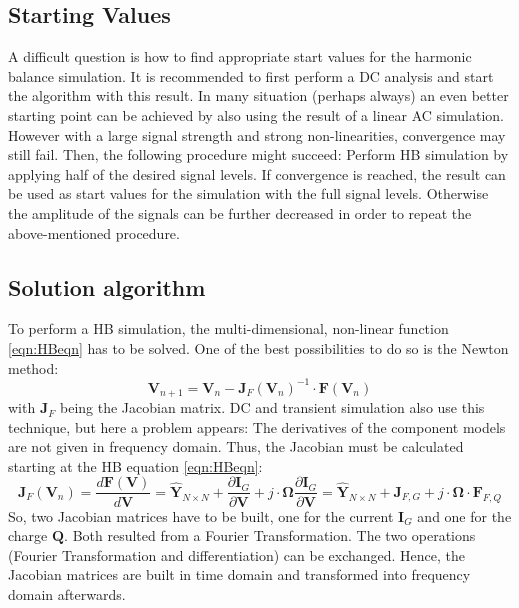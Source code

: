 \subsection{Starting Values}

A difficult question is how to find appropriate start values for the
harmonic balance simulation. It is recommended to first perform a DC
analysis and start the algorithm with this result. In many situation
(perhaps always) an even better starting point can be achieved by
also using the result of a linear AC simulation. However with a large
signal strength and strong non-linearities, convergence may still
fail. Then, the following procedure might succeed: Perform HB
simulation by applying half of the desired signal levels. If convergence
is reached, the result can be used as start values for the simulation
with the full signal levels. Otherwise the amplitude of the signals can
be further decreased in order to repeat the above-mentioned procedure.


\subsection{Solution algorithm}

To perform a HB simulation, the multi-dimensional, non-linear function
\ref{eqn:HBeqn} has to be solved. One of the best possibilities to
do so is the Newton method:
\begin{equation}
\textbf{V}_{n+1} = \textbf{V}_n - \textbf{J}_F (\textbf{V}_n)^{-1}
                   \cdot \textbf{F} (\textbf{V}_n)
\end{equation}
with $\textbf{J}_F$ being the Jacobian matrix. DC and transient
simulation also use this technique, but here a problem appears:
The derivatives of the component models are not given in frequency
domain. Thus, the Jacobian must be calculated starting at the HB
equation \ref{eqn:HBeqn}:
\begin{equation}
\boldsymbol{J}_F (\boldsymbol{V}_n) = \frac{d\boldsymbol{F} (\boldsymbol{V})}{d\boldsymbol{V}}
    = \boldsymbol{\hat{Y}}_{N \times N} + \frac{\partial \boldsymbol{I}_G}{\partial \boldsymbol{V}}
     + j\cdot \boldsymbol{\Omega}\frac{\partial \boldsymbol{I}_G}{\partial \boldsymbol{V}}
    = \boldsymbol{\hat{Y}}_{N \times N} + \boldsymbol{J}_{F,G}
     + j\cdot \boldsymbol{\Omega}\cdot\boldsymbol{F}_{F,Q}
\end{equation}
So, two Jacobian matrices have to be built, one for the current
$\boldsymbol{I}_G$ and one for the charge $\boldsymbol{Q}$. Both resulted
from a Fourier Transformation. The two operations (Fourier Transformation
and differentiation) can be exchanged. Hence, the Jacobian matrices
are built in time domain and transformed into frequency domain afterwards.

